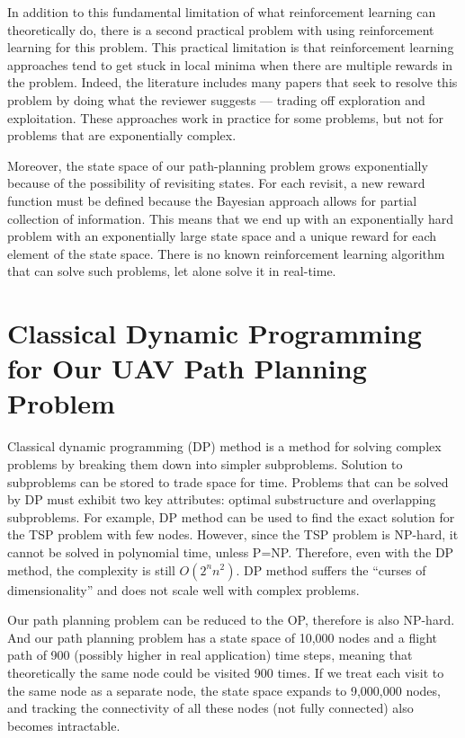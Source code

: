 In addition to this fundamental limitation of what reinforcement learning can theoretically do, there is a second practical problem with using reinforcement learning for this problem. This practical limitation is that reinforcement learning approaches tend to get stuck in local minima when there are multiple rewards in the problem.  Indeed, the literature includes many papers that seek to resolve this problem by doing what the reviewer suggests --- trading off exploration and exploitation.  These approaches work in practice for some problems, but not for problems that are exponentially complex.  

Moreover, the state space of our path-planning problem grows exponentially because of the possibility of revisiting states. For each revisit, a new reward function must be defined because the Bayesian approach allows for partial collection of information.  This means that we end up with an exponentially hard problem with an exponentially large state space and a unique reward for each element of the state space.  There is no known reinforcement learning algorithm that can solve such problems, let alone solve it in real-time.

\section{Classical Dynamic Programming for Our UAV Path Planning Problem}
\label{CDPUAV}

Classical dynamic programming (DP) method is a method for solving complex problems by breaking them down into simpler subproblems. Solution to subproblems can be stored to trade space for time. Problems that can be solved by DP must exhibit two key attributes: optimal substructure and overlapping subproblems. For example, DP method can be used to find the exact solution for the TSP problem with few nodes. However, since the TSP problem is NP-hard, it cannot be solved in polynomial time, unless P=NP. Therefore, even with the DP method, the complexity is still $O(2^n n^2)$. DP method suffers the ``curses of dimensionality'' and does not scale well with complex problems.

Our path planning problem can be reduced to the OP, therefore is also NP-hard. And our path planning problem has a state space of 10,000 nodes and a flight path of 900 (possibly higher in real application) time steps, meaning that theoretically the same node could be visited 900 times. If we treat each visit to the same node as a separate node, the state space expands to 9,000,000 nodes, and tracking the connectivity of all these nodes (not fully connected) also becomes intractable.

